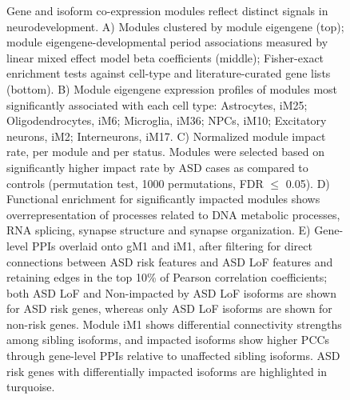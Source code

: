 \documentclass[12pt,chapterheads,final]{ucsd}
\begin{document}
\begin{figure}[h]
  \centering
  \caption[Gene and isoform co-expression modules reflect distinct signals in neurodevelopment.]
{Gene and isoform co-expression modules reflect distinct signals in neurodevelopment. A) Modules clustered by module eigengene (top); module eigengene-developmental period associations measured by linear mixed effect model beta coefficients (middle); Fisher-exact enrichment tests against cell-type and literature-curated gene lists (bottom). B) Module eigengene expression profiles of modules most significantly associated with each cell type: Astrocytes, iM25; Oligodendrocytes, iM6; Microglia, iM36; NPCs, iM10; Excitatory neurons, iM2; Interneurons, iM17. C) Normalized module impact rate, per module and per status. Modules were selected based on significantly higher impact rate by ASD cases as compared to controls (permutation test, 1000 permutations, FDR $\leq$ 0.05). D) Functional enrichment for significantly impacted modules shows overrepresentation of processes related to DNA metabolic processes, RNA splicing, synapse structure and synapse organization. E) Gene-level PPIs overlaid onto gM1 and iM1, after filtering for direct connections between ASD risk features and ASD LoF features and retaining edges in the top 10\% of Pearson correlation coefficients; both ASD LoF and Non-impacted by ASD LoF isoforms are shown for ASD risk genes, whereas only ASD LoF isoforms are shown for non-risk genes. Module iM1 shows differential connectivity strengths among sibling isoforms, and impacted isoforms show higher PCCs through gene-level PPIs relative to unaffected sibling isoforms. ASD risk genes with differentially impacted isoforms are highlighted in turquoise.}
\end{figure}
\end{document}
